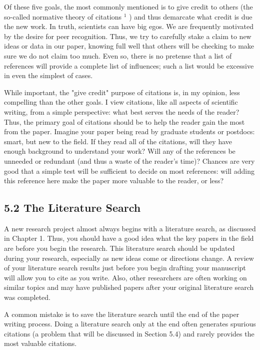 Of these five goals, the most commonly mentioned is to give credit to others (the so-called normative theory of citations ${ }^{1}$ ) and thus demarcate what credit is due the new work. In truth, scientists can have big egos. We are frequently motivated by the desire for peer recognition. Thus, we try to carefully stake a claim to new ideas or data in our paper, knowing full well that others will be checking to make sure we do not claim too much. Even so, there is no pretense that a list of references will provide a complete list of influences; such a list would be excessive in even the simplest of cases.

While important, the "give credit" purpose of citations is, in my opinion, less compelling than the other goals. I view citations, like all aspects of scientific writing, from a simple perspective: what best serves the needs of the reader? Thus, the primary goal of citations should be to help the reader gain the most from the paper. Imagine your paper being read by graduate students or postdocs: smart, but new to the field. If they read all of the citations, will they have enough background to understand your work? Will any of the references be unneeded or redundant (and thus a waste of the reader's time)? Chances are very good that a simple test will be sufficient to decide on most references: will adding this reference here make the paper more valuable to the reader, or less?

\subsection*{5.2 The Literature Search}
A new research project almost always begins with a literature search, as discussed in Chapter 1. Thus, you should have a good idea what the key papers in the field are before you begin the research. This literature search should be updated during your research, especially as new ideas come or directions change. A review of your literature search results just before you begin drafting your manuscript will allow you to cite as you write. Also, other researchers are often working on similar topics and may have published papers after your original literature search was completed.

A common mistake is to save the literature search until the end of the paper writing process. Doing a literature search only at the end often generates spurious citations (a problem that will be discussed in Section 5.4) and rarely provides the most valuable citations.

